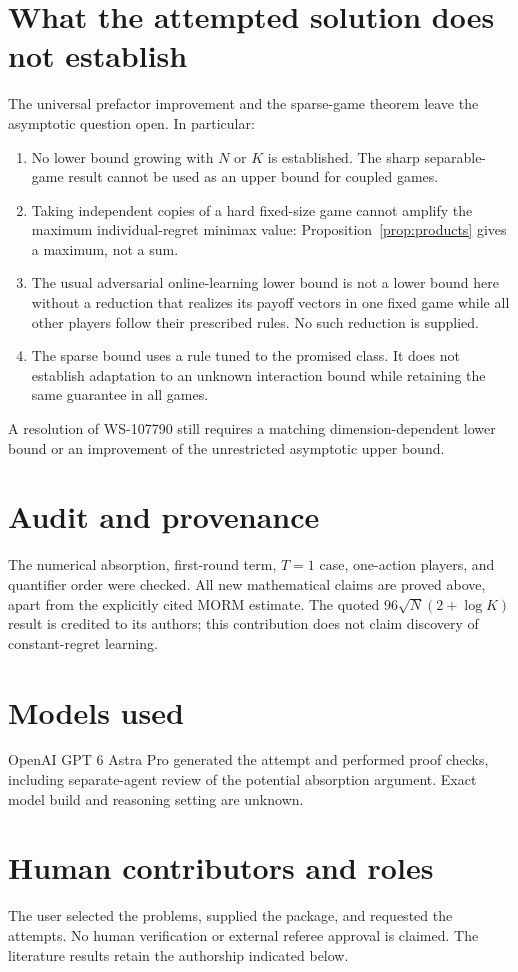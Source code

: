 \documentclass[11pt]{article}
\begin{document}
\section{What the attempted solution does not establish}
The universal prefactor improvement and the sparse-game theorem leave
the asymptotic question open. In particular:
\begin{enumerate}[leftmargin=*]
\item No lower bound growing with $N$ or $K$ is established. The sharp
separable-game result cannot be used as an upper bound for coupled games.
\item Taking independent copies of a hard fixed-size game cannot amplify
the maximum individual-regret minimax value: Proposition~\ref{prop:products}
gives a maximum, not a sum.
\item The usual adversarial online-learning lower bound is not a lower
bound here without a reduction that realizes its payoff vectors in one
fixed game while all other players follow their prescribed rules.
No such reduction is supplied.
\item The sparse bound uses a rule tuned to the promised class. It does
not establish adaptation to an unknown interaction bound while retaining
the same guarantee in all games.
\end{enumerate}
A resolution of WS-107790 still requires a matching dimension-dependent
lower bound or an improvement of the unrestricted asymptotic upper bound.

\section*{Audit and provenance}
The numerical absorption, first-round term, $T=1$ case, one-action
players, and quantifier order were checked. All new mathematical claims
are proved above, apart from the explicitly cited MORM estimate.
The quoted $96\sqrt N(2+\log K)$ result is credited to its authors;
this contribution does not claim discovery of constant-regret learning.
\section*{Models used}
OpenAI GPT 6 Astra Pro generated the attempt and performed proof checks,
including separate-agent review of the potential absorption argument.
Exact model build and reasoning setting are unknown.

\section*{Human contributors and roles}
The user selected the problems, supplied the package, and requested the
attempts. No human verification or external referee approval is claimed.
The literature results retain the authorship indicated below.
\end{document}
